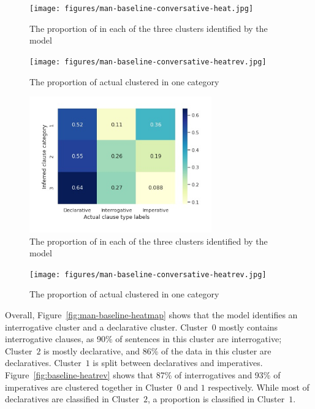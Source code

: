 \begin{figure}[H]
    \centering
    \texttt{[image: figures/man-baseline-conversative-heat.jpg]}
    \caption{The proportion of \diis{} in each of the three clusters identified by the \dlearnerabbr{} model}
    \label{fig:man-baseline-conversative-heat}
\end{figure}


\begin{figure}[H]
    \centering
    \texttt{[image: figures/man-baseline-conversative-heatrev.jpg]}
    \caption{The proportion of actual \diis{} clustered in one category}
    \label{fig:man-baseline-conversative-heatrev}
\end{figure}

\begin{figure}[H]
    \centering
    \includegraphics[width=0.7\textwidth]{figures/man-baseline-mid-heat.jpg}
    \caption{The proportion of \diis{} in each of the three clusters identified by the \dlearnerabbr{} model}
    \label{fig:man-baseline-mid-heat}
\end{figure}


\begin{figure}[H]
    \centering
    \texttt{[image: figures/man-baseline-conversative-heatrev.jpg]}
    \caption{The proportion of actual \diis{} clustered in one category}
    \label{fig:man-baseline-mid-heatrev}
\end{figure}

Overall, Figure~\ref{fig:man-baseline-heatmap} shows that the \dlearnerabbr{} model identifies an interrogative cluster and a declarative cluster. Cluster~$0$ mostly contains interrogative clauses, as 90\% of sentences in this cluster are interrogative; Cluster~$2$ is mostly declarative, and 86\% of the data in this cluster are declaratives. Cluster~$1$ is split between declaratives and imperatives. Figure~\ref{fig:baseline-heatrev} shows that 87\% of interrogatives and 93\% of imperatives are clustered together in Cluster~$0$ and $1$ respectively. While most of declaratives are classified in Cluster~$2$, a proportion is classified in Cluster~$1$.

